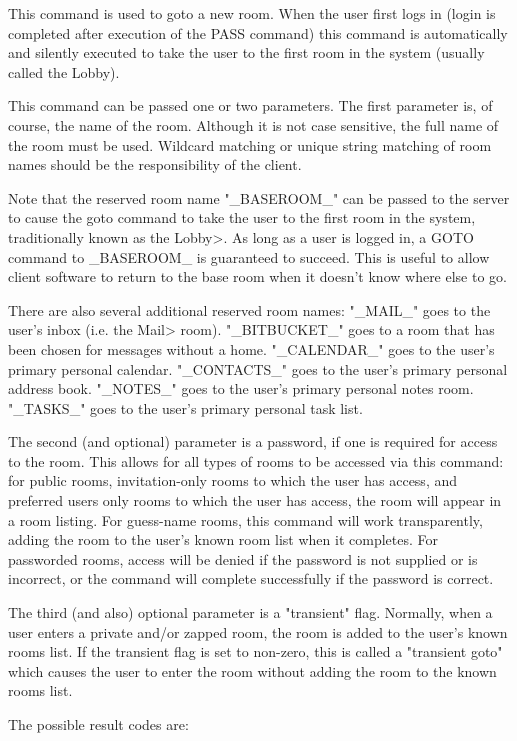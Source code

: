  This command is used to goto a new room.  When the user first logs in (login
is completed after execution of the PASS command) this command is
automatically and silently executed to take the user to the first room in the
system (usually called the Lobby).

 This command can be passed one or two parameters.  The first parameter is,
of course, the name of the room.  Although it is not case sensitive, the
full name of the room must be used.  Wildcard matching or unique string
matching of room names should be the responsibility of the client.

 Note that the reserved room name "_BASEROOM_" can be passed to the server
to cause the goto command to take the user to the first room in the system,
traditionally known as the Lobby>.   As long as a user is logged in, a
GOTO command to _BASEROOM_ is guaranteed to succeed.  This is useful to
allow client software to return to the base room when it doesn't know
where else to go.

 There are also several additional reserved room names:
 "_MAIL_" goes to the user's inbox (i.e. the Mail> room).
 "_BITBUCKET_" goes to a room that has been chosen for messages without a home.
 "_CALENDAR_" goes to the user's primary personal calendar.
 "_CONTACTS_" goes to the user's primary personal address book.
 "_NOTES_" goes to the user's primary personal notes room.
 "_TASKS_" goes to the user's primary personal task list.


 The second (and optional) parameter is a password, if one is required for
access to the room.  This allows for all types of rooms to be accessed via
this command: for public rooms, invitation-only rooms to which the user
has access, and preferred users only rooms to which the user has access, the
room will appear in a room listing.  For guess-name rooms, this command
will work transparently, adding the room to the user's known room list when
it completes.  For passworded rooms, access will be denied if the password
is not supplied or is incorrect, or the command will complete successfully
if the password is correct.

 The third (and also) optional parameter is a "transient" flag.  Normally,
when a user enters a private and/or zapped room, the room is added to the
user's known rooms list.  If the transient flag is set to non-zero, this is
called a "transient goto" which causes the user to enter the room without
adding the room to the known rooms list.

 The possible result codes are:

